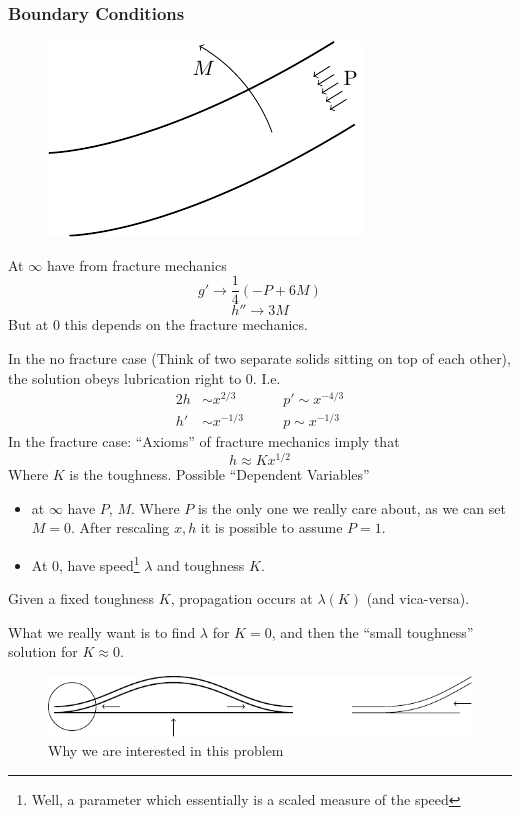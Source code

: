 \documentclass{article}
\begin{document}
\subsubsection*{Boundary Conditions}

\begin{figure}[!ht]\centering
\includegraphics{Fig2.pdf}
\end{figure}
At $\infty$ have from fracture mechanics
\[ g' \to \frac{1}{4}(-P+6M)\]
\[ h'' \to 3M\]
But at 0 this depends on the fracture mechanics.

In the no fracture case (Think of two separate solids sitting on top of each
other), the solution obeys lubrication right to 0. I.e. 
\begin{alignat*}{2}
h &\sim x^{2/3}  \qquad & p'\sim x^{-4/3} \\
h' & \sim x^{-1/3} \qquad &  p\sim x^{-1/3}
\end{alignat*}
In the fracture case: ``Axioms'' of fracture mechanics imply that
\[h \approx Kx^{1/2} \]
Where $K$ is the toughness.
Possible ``Dependent Variables''
\begin{itemize}
\item at $\infty$ have $P$, $M$. Where $P$ is the only
	one we really care about, as we can set $M=0$. After rescaling 
	$x,h$ it is possible to assume $P=1$.
\item At 0, have speed\footnote{Well, a parameter which essentially is a 
	scaled measure of the speed} $\lambda$ and toughness $K$.
\end{itemize}
Given a fixed toughness $K$, propagation occurs at $\lambda(K)$ 
(and vica-versa).

What we really want is to find $\lambda$ for $K=0$, and then the 
``small toughness'' solution for $K\approx0$.
\begin{figure}[!ht]\centering
\caption{Why we are interested in this problem}
\includegraphics{Fig3.pdf}
\end{figure}
\end{document}
